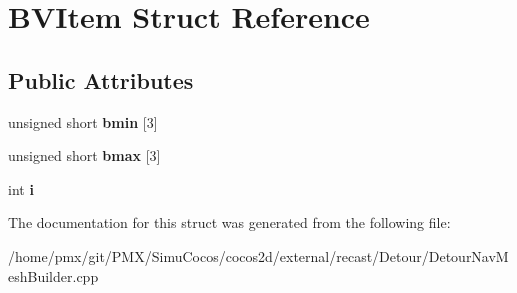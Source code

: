 \hypertarget{structBVItem}{}\section{B\+V\+Item Struct Reference}
\label{structBVItem}
\subsection*{Public Attributes}
\begin{DoxyCompactItemize}
\item 
\mbox{\label{structBVItem_ac8f4a7fb7e02184eee6e703e3d451a18}} 
unsigned short {\bfseries bmin} \mbox{[}3\mbox{]}
\item 
\mbox{\label{structBVItem_a977e1bd56e5150808d8afce673494cea}} 
unsigned short {\bfseries bmax} \mbox{[}3\mbox{]}
\item 
\mbox{\label{structBVItem_a50d6602a0adbcd8ac0bfa5e20edd554a}} 
int {\bfseries i}
\end{DoxyCompactItemize}


The documentation for this struct was generated from the following file\+:\begin{DoxyCompactItemize}
\item 
/home/pmx/git/\+P\+M\+X/\+Simu\+Cocos/cocos2d/external/recast/\+Detour/Detour\+Nav\+Mesh\+Builder.\+cpp\end{DoxyCompactItemize}
